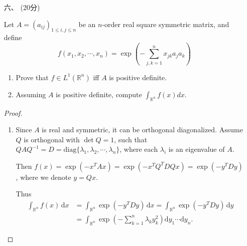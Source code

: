 \begin{itemize}
\begin{proof}
但我们有
$$
\int_{}^{}{f\varphi}=\sum_{}^{}{\frac{1}{k}\int_{E_k}^{}{f^2}\ge \sum_{}^{}{\frac{1}{k}}=\infty}
$$

这与题设矛盾.

最后，还可以用[[闭图像定理]]。考虑$M_f\colon \mathcal{L}^{2}(\mathbb{R}) \rightarrow \mathcal{L}^{1}(\mathbb{R}) ,\varphi\mapsto f\varphi$.
它是闭算子，这是因为设
\[\varphi_n\stackrel{\mathcal{L}^{2}}{\longrightarrow}\varphi,
\quad f\varphi_n\stackrel{\mathcal{L}^{1}}{\longrightarrow}\psi,\]
有$\varphi_n,f\varphi_n$依测度收敛于$\varphi,\psi$，
又不难说明$f\varphi_n$依测度收敛于$f\varphi$，从而$f\varphi=\psi$.
于是由闭图像定理，$M_f$是有界算子，即$\|M_f\|<\infty$。
那么取$\varphi=f\chi_{[-n,n]\cap\{|f|\leq n\}}$，得到
\[\|f\chi_{[-n,n]\cap\{|f|\leq n\}}\|_2
=\dfrac{\|f\varphi\|_1}{\|\varphi\|_2}\leq\|M_f\|,\]
故$\|f\|_2\leq\|M_f\|$.
\end{proof}

\item[六、](20分)

Let $ A=(a_{ij})_{1\le i,j\le n} $ be an $ n$-order real square symmetric matrix, and define
$$ f( x_1,x_2,\cdots ,x_n ) =\exp \left( -\sum_{j,k=1}^n{x_{jk}a_ja_k} \right)  $$
\begin{enumerate}
\item Prove that $ f\in L^{1}(\mathbb{R} ^{n}) $ iff $ A $ is positive definite.
\item Assuming $ A $ is positive definite, compute $ \int_{\mathbb{R} ^{n}}f(x)dx $.
\end{enumerate}

\begin{proof}
	\begin{enumerate}
	\item Since $ A $ is real and symmetric, it can be orthogonal diagonalized. Assume $ Q $ is orthogonal with $ \det Q=1 $, such that $ QAQ^{-1}=D=\mathrm{diag} \{\lambda_{1},\lambda_{2},\cdots,\lambda_{n}\} $, where each $ \lambda_{i} $ is an eigenvalue of $ A $.
	
	Then $ f(x)=\exp(-x^{T}Ax)=\exp(-x^{T}Q^{T}DQx)=\exp(-y^{T}Dy) $, where we denote $ y=Qx $.
	
	Thus 
	\begin{align*}
	\int_{\mathbb{R}^n}{f(x)\,\mathrm{d}x}
    &=\int_{\mathbb{R}^n}{\exp(-y^TDy)\,\mathrm{d}x}
    =\int_{\mathbb{R}^n}{\exp(-y^TDy)\,\mathrm{d}y}\\
    &=\int_{\mathbb{R}^n}{\exp \left( -\sum_{k=1}^n{\lambda _ky_{k}^{2}} \right) \mathrm{d} y_1\cdots \mathrm{d} y_n}.
	\end{align*}
	

\end{enumerate}
\end{proof}
\end{itemize}
